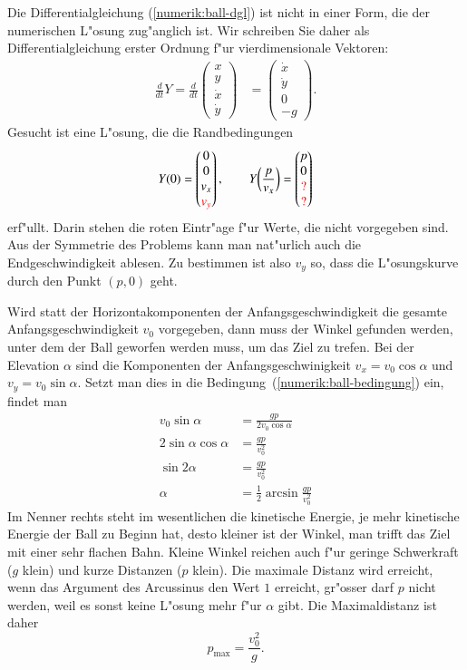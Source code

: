 Die Differentialgleichung (\ref{numerik:ball-dgl}) ist nicht in einer
Form, die der numerischen L"osung zug"anglich ist.
Wir schreiben Sie daher als Differentialgleichung erster Ordnung 
f"ur vierdimensionale Vektoren:
\begin{align}
\frac{d}{dt}Y
=
\frac{d}{dt}\begin{pmatrix}x\\y\\\dot x\\\dot y\end{pmatrix}
&=
\begin{pmatrix}\dot x\\\dot y\\ 0\\ -g\end{pmatrix}.
\label{numerik:ball-dgl-1}
\end{align}
Gesucht ist eine L"osung, die die Randbedingungen
\begin{equation}
Y(0)
=
\begin{pmatrix}0\\0\\v_x\\\color{red}v_y\end{pmatrix},
\qquad
Y\biggl(\frac{p}{v_x}\biggr)
=
\begin{pmatrix}p\\0\\\color{red}?\\\color{red}?\end{pmatrix}
\end{equation}
erf"ullt.
Darin stehen die roten Eintr"age f"ur Werte, die nicht vorgegeben sind.
Aus der Symmetrie des Problems kann man nat"urlich auch die Endgeschwindigkeit
ablesen.
Zu bestimmen ist also $v_y$ so, dass die L"osungskurve durch den Punkt
$(p,0)$ geht.

Wird statt der Horizontakomponenten der Anfangsgeschwindigkeit die
gesamte Anfangsgeschwindigkeit $v_0$ vorgegeben, dann muss der
Winkel gefunden werden, unter dem der Ball geworfen werden muss,
um das Ziel zu trefen.
Bei der Elevation $\alpha$ sind die Komponenten der Anfangsgeschwinigkeit
$v_x=v_0\cos\alpha$ und $v_y=v_0\sin\alpha$. 
Setzt man dies in die Bedingung~(\ref{numerik:ball-bedingung}) ein,
findet man
\begin{align*}
v_0 \sin \alpha &=\frac{gp}{2v_0\cos\alpha}
\\
2\sin\alpha\cos\alpha&=\frac{gp}{v_0^2}
\\
\sin2\alpha&=\frac{gp}{v_0^2}
\\
\alpha&= \frac12 \arcsin\frac{gp}{v_0^2}
\end{align*}
Im Nenner rechts steht im wesentlichen die kinetische Energie,
je mehr kinetische Energie der Ball zu Beginn hat, desto kleiner
ist der Winkel, man trifft das Ziel mit einer sehr flachen Bahn.
Kleine Winkel reichen auch f"ur geringe Schwerkraft ($g$ klein)
und kurze Distanzen ($p$ klein).
Die maximale Distanz wird erreicht, wenn das Argument des Arcussinus
den Wert $1$ erreicht, gr"osser darf $p$ nicht werden, weil es sonst
keine L"osung mehr f"ur $\alpha$ gibt.
Die Maximaldistanz ist daher
\[
p_{\text{max}} = \frac{v_0^2}{g}.
\]

